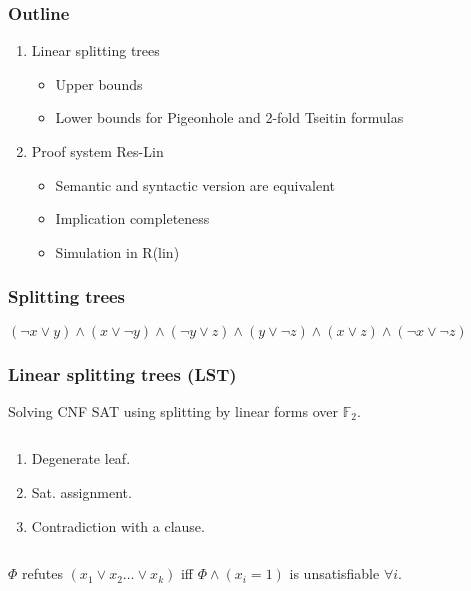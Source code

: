 \begin{frame}
    \frametitle{Outline}
    \begin{enumerate}
		\item Linear splitting trees
			\begin{itemize}
				\item Upper bounds
				\item Lower bounds for Pigeonhole and 2-fold Tseitin formulas
			\end{itemize}

		\item Proof system Res-Lin 
			\begin{itemize}
				\item Semantic and syntactic version are equivalent
				\item Implication completeness
				\item Simulation in R(lin)
			\end{itemize}

	\end{enumerate}
\end{frame}


\begin{frame}
    \frametitle{Splitting trees}
    $(\lnot x \lor y) \land (x \lor \lnot y) \land (\lnot y \lor z) \land
    	(y \lor \lnot z) \land (x \lor z) \land (\lnot x \lor \lnot z)$ 
	\only<1>{}
	\only<2>{}
\end{frame}



\begin{frame}
    \frametitle{Linear splitting trees (LST)}
    
	Solving CNF SAT using splitting by linear forms over $\mathbb{F}_2$.

    \begin{columns}[T]
        \begin{column}{4cm}
            \begin{enumerate}
                \item<1-> Degenerate leaf.
                \item<2-> Sat. assignment.
            	\item<3-> Contradiction with a clause.
            \end{enumerate}
        \end{column}
        \begin{column}{4cm}
            \begin{minipage}[c][.6\textheight][c]{\linewidth}
        	\end{minipage}
        \end{column}
    \end{columns}
    
	$\Phi$ refutes $(x_1 \lor x_2 \dots \lor x_k)$ iff $\Phi \land (x_i = 1)$ is
    unsatisfiable $\forall i$.
\end{frame}




